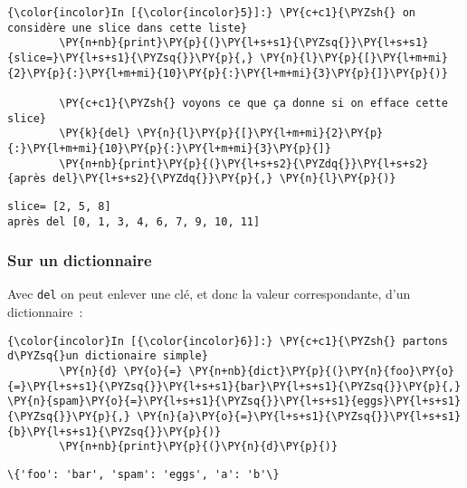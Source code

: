     \begin{Verbatim}[commandchars=\\\{\}]
{\color{incolor}In [{\color{incolor}5}]:} \PY{c+c1}{\PYZsh{} on considère une slice dans cette liste}
        \PY{n+nb}{print}\PY{p}{(}\PY{l+s+s1}{\PYZsq{}}\PY{l+s+s1}{slice=}\PY{l+s+s1}{\PYZsq{}}\PY{p}{,} \PY{n}{l}\PY{p}{[}\PY{l+m+mi}{2}\PY{p}{:}\PY{l+m+mi}{10}\PY{p}{:}\PY{l+m+mi}{3}\PY{p}{]}\PY{p}{)}
        
        \PY{c+c1}{\PYZsh{} voyons ce que ça donne si on efface cette slice}
        \PY{k}{del} \PY{n}{l}\PY{p}{[}\PY{l+m+mi}{2}\PY{p}{:}\PY{l+m+mi}{10}\PY{p}{:}\PY{l+m+mi}{3}\PY{p}{]}
        \PY{n+nb}{print}\PY{p}{(}\PY{l+s+s2}{\PYZdq{}}\PY{l+s+s2}{après del}\PY{l+s+s2}{\PYZdq{}}\PY{p}{,} \PY{n}{l}\PY{p}{)}
\end{Verbatim}


    \begin{Verbatim}[commandchars=\\\{\}]
slice= [2, 5, 8]
après del [0, 1, 3, 4, 6, 7, 9, 10, 11]

    \end{Verbatim}

    \hypertarget{sur-un-dictionnaire}{%
\subsubsection{Sur un dictionnaire}\label{sur-un-dictionnaire}}

    Avec \texttt{del} on peut enlever une clé, et donc la valeur
correspondante, d'un dictionnaire~:

    \begin{Verbatim}[commandchars=\\\{\}]
{\color{incolor}In [{\color{incolor}6}]:} \PY{c+c1}{\PYZsh{} partons d\PYZsq{}un dictionaire simple}
        \PY{n}{d} \PY{o}{=} \PY{n+nb}{dict}\PY{p}{(}\PY{n}{foo}\PY{o}{=}\PY{l+s+s1}{\PYZsq{}}\PY{l+s+s1}{bar}\PY{l+s+s1}{\PYZsq{}}\PY{p}{,} \PY{n}{spam}\PY{o}{=}\PY{l+s+s1}{\PYZsq{}}\PY{l+s+s1}{eggs}\PY{l+s+s1}{\PYZsq{}}\PY{p}{,} \PY{n}{a}\PY{o}{=}\PY{l+s+s1}{\PYZsq{}}\PY{l+s+s1}{b}\PY{l+s+s1}{\PYZsq{}}\PY{p}{)}
        \PY{n+nb}{print}\PY{p}{(}\PY{n}{d}\PY{p}{)}
\end{Verbatim}


    \begin{Verbatim}[commandchars=\\\{\}]
\{'foo': 'bar', 'spam': 'eggs', 'a': 'b'\}

    \end{Verbatim}


